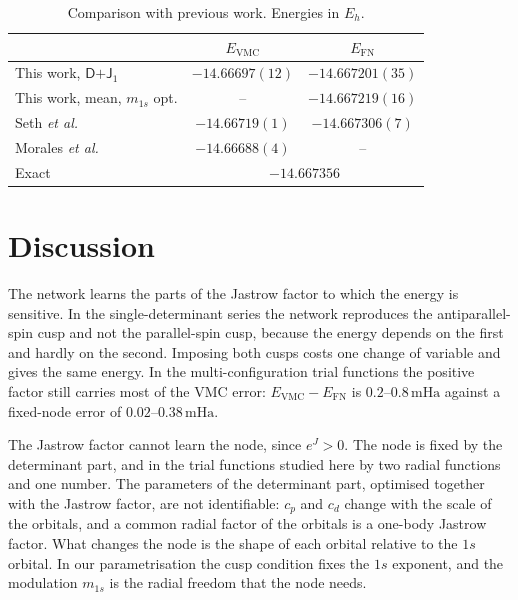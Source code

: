 \documentclass[aps,prb,reprint,amsmath,amssymb,superscriptaddress,nofootinbib]{revtex4-2}
\newcommand{\mDJ}{\ensuremath{\textsf{D+J}_1}}
\newcommand{\mHa}{\,\mathrm{mHa}}
\begin{document}
\begin{table}[t]
\caption{Comparison with previous work. Energies in $E_h$.}
\label{tab:literature}
\centering
\small
\setlength{\tabcolsep}{2pt}
\begin{tabular}{lcc}
\hline\hline
 & $E_{\mathrm{VMC}}$ & $E_{\mathrm{FN}}$ \\
\hline
This work, \mDJ              & $-14.66697(12)$ & $-14.667201(35)$ \\
This work, mean, $m_{1s}$ opt. & --             & $-14.667219(16)$ \\
Seth \emph{et al.}~\cite{seth2011}     & $-14.66719(1)$ & $-14.667306(7)$ \\
Morales \emph{et al.}~\cite{morales2012} & $-14.66688(4)$ & -- \\
Exact~\cite{pachucki2006}    & \multicolumn{2}{c}{$-14.667356$} \\
\hline\hline
\end{tabular}
\end{table}


\section{Discussion}
\label{sec:discussion}

The network learns the parts of the Jastrow factor to which the energy is
sensitive. In the single-determinant series the network reproduces the antiparallel-spin cusp
and not the parallel-spin cusp, because the energy depends on the first and
hardly on the second. Imposing both cusps costs one change of variable and
gives the same energy. In the multi-configuration trial functions the positive
factor still carries most of the VMC error: $E_{\mathrm{VMC}} -
E_{\mathrm{FN}}$ is $0.2$--$0.8\mHa$ against a fixed-node error of
$0.02$--$0.38\mHa$.

The Jastrow factor cannot learn the node, since $e^J > 0$. The node is fixed
by the determinant part, and in the trial functions studied here by two
radial functions and one number. The parameters of the determinant part,
optimised together with the Jastrow factor, are not identifiable: $c_p$ and
$c_d$ change with the scale of the orbitals, and a common radial factor of the
orbitals is a one-body Jastrow factor. What changes the node is the shape of
each orbital relative to the $1s$ orbital. In our parametrisation the cusp
condition fixes the $1s$ exponent, and the modulation $m_{1s}$ is the radial
freedom that the node needs.
\end{document}
